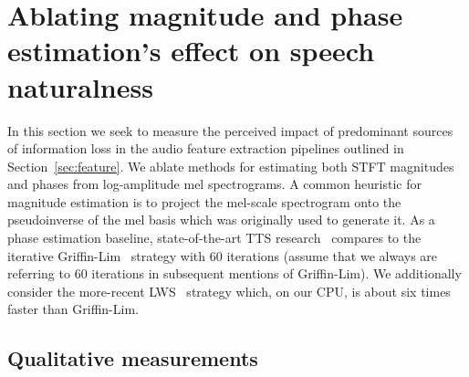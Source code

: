 \documentclass[a4paper]{article}
\begin{document}
\section{Ablating magnitude and phase estimation's effect on speech naturalness}
\label{sec:magphs}

In this section we seek to measure the perceived impact of predominant sources of information loss in the audio feature extraction pipelines outlined in Section~\ref{sec:feature}. 
We ablate methods for estimating both STFT magnitudes and phases from log-amplitude mel spectrograms. 
A common heuristic for magnitude estimation is to project the mel-scale spectrogram onto the pseudoinverse of the mel basis which was originally used to generate it. 
As a phase estimation baseline, state-of-the-art TTS research~\cite{ping2017deep,shen2018natural} compares to the iterative Griffin-Lim~\cite{griffinlim} strategy with $60$ iterations (assume that we always are referring to $60$ iterations in subsequent mentions of Griffin-Lim). 
We additionally consider the more-recent LWS~\cite{lws} strategy which, on our CPU, is about six times faster than Griffin-Lim. 



\subsection{Qualitative measurements}
\label{sec:crowdmos}

\end{document}
